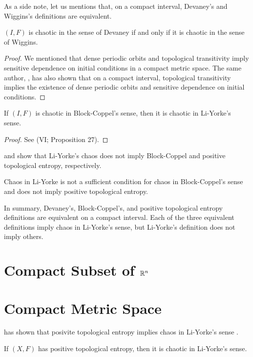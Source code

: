 \documentclass[12pt,twoside,draft]{book}
\begin{document}
As a side note, let us mentions that, on a compact interval, Devaney's and Wiggins's definitions are equivalent.
\begin{theorem}
   $(I,F)$ is chaotic in the sense of Devaney if and only if it is chaotic in the sense of Wiggins.
  \label{thm:devaney-wiggins}
  \begin{proof}
    We mentioned that dense periodic orbits and topological transitivity imply sensitive dependence on initial conditions in a compact metric space.
    The same author, \citet{silverman}, has also shown that on a compact interval, topological transitivity implies the existence of dense periodic orbits and sensitive dependence on initial conditions.
  \end{proof}
\end{theorem}

\begin{theorem}
  \citep{blockcoppel}
  If $(I,F)$ is chaotic in Block-Coppel's sense, then it is chaotic in Li-Yorke's sense.
  \label{thm:devaney-liyorke}
  \begin{proof}
    See \citet{blockcoppel} (VI; Proposition 27).
  \end{proof}
\end{theorem}

\citet{aulbach} and \citet{smital} show that Li-Yorke's chaos does not imply Block-Coppel and positive topological entropy, respectively.
\begin{theorem}
  \citep{aulbach, smital}
  Chaos in Li-Yorke is not a sufficient condition for chaos in Block-Coppel's sense and does not imply positive topological entropy.
  \label{thm:counterexample1}
\end{theorem}

In summary, Devaney's, Block-Coppel's, and positive topological entropy definitions are equivalent on a compact interval.
Each of the three equivalent definitions imply chaos in Li-Yorke's sense, but Li-Yorke's definition does not imply others.

\section{Compact Subset of $\mathbb{R}^n$}

\section{Compact Metric Space}

\citet{blanchard} has shown that posivite topological entropy implies chaos in Li-Yorke's sense .
\begin{theorem}
  If $(X,F)$ has positive topological entropy, then it is chaotic in Li-Yorke's sense.
  \label{thm:entropy-liyorke}
\end{theorem}
\end{document}
